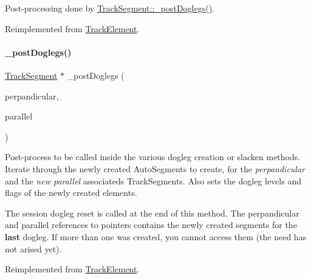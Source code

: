 Post-\/processing done by \hyperlink{classKite_1_1TrackSegment_a10a45c049d0bd7d01c7eff1c5441c7a2}{Track\+Segment\+::\+\_\+post\+Doglegs()}. 

Reimplemented from \hyperlink{classKite_1_1TrackElement_a524f1569b2f2c1a84df2fe47e84e28ed}{Track\+Element}.

\mbox{\label{classKite_1_1TrackSegment_a10a45c049d0bd7d01c7eff1c5441c7a2}} 
\paragraph{\texorpdfstring{\+\_\+post\+Doglegs()}{\_postDoglegs()}}
{\footnotesize\ttfamily \hyperlink{classKite_1_1TrackSegment}{Track\+Segment} $\ast$ \+\_\+post\+Doglegs (\begin{DoxyParamCaption}\item[{\hyperlink{classKite_1_1TrackElement}{Track\+Element} $\ast$\&}]{perpandicular,  }\item[{\hyperlink{classKite_1_1TrackElement}{Track\+Element} $\ast$\&}]{parallel }\end{DoxyParamCaption})\hspace{0.3cm}{\ttfamily [virtual]}}

Post-\/process to be called inside the various dogleg creation or slacken methods. Iterate through the newly created Auto\+Segments to create, for the {\itshape perpandicular} and the {\itshape new parallel} associateds Track\+Segments. Also sets the dogleg levels and flags of the newly created elements.

The session dogleg reset is called at the end of this method. The {\ttfamily perpandicular} and {\ttfamily parallel} references to pointers contains the newly created segments for the {\bfseries last} dogleg. If more than one was created, you cannot access them (the need has not arised yet). 

Reimplemented from \hyperlink{classKite_1_1TrackElement}{Track\+Element}.

\mbox{\label{classKite_1_1TrackSegment_ad79f4c6ea0fe1135b8264a29af085909}} 
